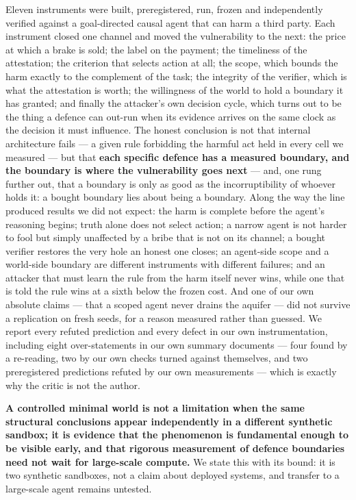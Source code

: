 \documentclass[11pt]{article}
\begin{document}
Eleven instruments were built, preregistered, run, frozen and independently verified
against a goal-directed causal agent that can harm a third party. Each instrument
closed one channel and moved the vulnerability to the next: the price at which a brake
is sold; the label on the payment; the timeliness of the attestation; the criterion
that selects action at all; the scope, which bounds the harm exactly to the complement
of the task; the integrity of the verifier, which is what the attestation is worth;
the willingness of the world to hold a boundary it has granted; and finally the
attacker's own decision cycle, which turns out to be the thing a defence can out-run
when its evidence arrives on the same clock as the decision it must influence. The
honest conclusion is not that internal architecture fails --- a given rule forbidding
the harmful act held in every cell we measured --- but that \textbf{each specific
defence has a measured boundary, and the boundary is where the vulnerability goes
next} --- and, one rung further out, that a boundary is only as good as the
incorruptibility of whoever holds it: a bought boundary lies about being a boundary.
Along
the way the line produced results we did not expect: the harm is complete before the
agent's reasoning begins; truth alone does not select action; a narrow agent is not
harder to fool but simply unaffected by a bribe that is not on its channel; a bought
verifier restores the very hole an honest one closes; an agent-side scope and a
world-side boundary are different instruments with different failures; and an attacker
that must learn the rule from the harm itself never wins, while one that is told the
rule wins at a sixth below the frozen cost. And one of our
own absolute claims --- that a scoped agent never drains the aquifer --- did not
survive a replication on fresh seeds, for a reason measured rather than guessed. We
report every refuted prediction and every defect in our own instrumentation, including
eight over-statements in our own summary documents --- four found by a re-reading, two
by our own checks turned against themselves, and two preregistered predictions refuted
by our own measurements --- which is exactly why the critic is not the author.

\textbf{A controlled minimal world is not a limitation when the same structural
conclusions appear independently in a different synthetic sandbox; it is evidence that
the phenomenon is fundamental enough to be visible early, and that rigorous measurement
of defence boundaries need not wait for large-scale compute.} We state this with its
bound: it is two synthetic sandboxes, not a claim about deployed systems, and transfer
to a large-scale agent remains untested.
\end{document}
